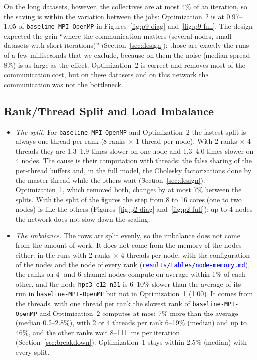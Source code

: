 \documentclass[conference,onecolumn]{IEEEtran}
\newcommand{\vbase}{\texttt{baseline-\allowbreak MPI-\allowbreak OpenMP}}
\newcommand{\repolink}[1]{\href{https://github.com/HPC-2627/ParallelExpectationMaximizationClustering/tree/main/#1}{\textcolor{blue}{\nolinkurl{#1}}}}
\begin{document}
On the long datasets, however, the collectives are at most 4\% of an iteration, so the saving is within the variation between the jobs: Optimization~2 is at 0.97--1.05 of \vbase{} in Figures~\ref{fig:p9-diag} and~\ref{fig:p9-full}. The design expected the gain ``where the communication matters (several nodes, small datasets with short iterations)'' (Section~\ref{sec:design}): those are exactly the runs of a few milliseconds that we exclude, because on them the noise (median spread 8\%) is as large as the effect. Optimization~2 is correct and removes most of the communication cost, but on these datasets and on this network the communication was not the bottleneck.

\subsection{Rank/Thread Split and Load Imbalance}\label{sec:disc-split}
\begin{itemize}
\item \emph{The split.} For \vbase{} and Optimization~2 the fastest split is always one thread per rank (8 ranks $\times$ 1 thread per node). With 2 ranks $\times$ 4 threads they are 1.3--1.9 times slower on one node and 1.3--4.0 times slower on 4 nodes. The cause is their computation with threads: the false sharing of the per-thread buffers and, in the full model, the Cholesky factorizations done by the master thread while the others wait (Section~\ref{sec:design}). Optimization~1, which removed both, changes by at most 7\% between the splits. With the split of the figures the step from 8 to 16 cores (one to two nodes) is like the others (Figures~\ref{fig:p2-diag} and~\ref{fig:p2-full}): up to 4 nodes the network does not slow down the scaling.
\item \emph{The imbalance.} The rows are split evenly, so the imbalance does not come from the amount of work. It does not come from the memory of the nodes either: in the runs with 2 ranks $\times$ 4 threads per node, with the configuration of the nodes and the node of every rank (\repolink{results/tables/node-memory.md}), the ranks on 4- and 6-channel nodes compute on average within 1\% of each other, and the node \texttt{hpc3-c12-n31} is 6--10\% slower than the average of its run in \vbase{} but not in Optimization~1 (1.00). It comes from the threads: with one thread per rank the slowest rank of \vbase{} and Optimization~2 computes at most 7\% more than the average (median 0.2--2.8\%), with 2 or 4 threads per rank 6--19\% (median) and up to 46\%, and the other ranks wait 8--111~ms per iteration (Section~\ref{sec:breakdown}). Optimization~1 stays within 2.5\% (median) with every split.
\end{itemize}
\end{document}
